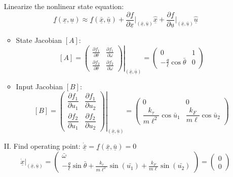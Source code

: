 \documentclass[10pt, fleqn]{article}
\begin{document}
\begin{multicols*}{2}
\begin{itemize}
    Linearize the nonlinear state equation:
    \[\underline{f}(\underline{x},\underline{u}) \approx \underline{f}(\underline{\bar{x}}, \underline{\bar{u}}) + \frac{\partial \underline{f}}{\partial \underline{x}}\bigg|_{(\underline{\bar{x}}, \underline{\bar{u}})} \underline{\hat{x}} + \frac{\partial \underline{f}}{\partial \underline{u}}\bigg|_{(\underline{\bar{x}}, \underline{\bar{u}})} \underline{\hat{u}}\]
    \begin{itemize}
        \item State Jacobian $[A]$:
        \[\renewcommand{\arraystretch}{1.8}
        [A] = \left.\begin{pmatrix}
\frac{\partial f_1}{\partial \theta} & \frac{\partial f_1}{\partial \omega} \\
\frac{\partial f_2}{\partial \theta} & \frac{\partial f_2}{\partial \omega}
\end{pmatrix}\right|_{(\underline{\bar{x}}, \underline{\bar{u}})}=
\begin{pmatrix}
0 & 1 \\
-\frac{g}{\ell}\cos\bar{\theta} & 0
\end{pmatrix}\]
        \item Input Jacobian $[B]$:
\[
\renewcommand{\arraystretch}{1.8}
[B] =
\left.
\begin{pmatrix}
\dfrac{\partial f_1}{\partial u_1} & \dfrac{\partial f_1}{\partial u_2} \\
\dfrac{\partial f_2}{\partial u_1} & \dfrac{\partial f_2}{\partial u_2}
\end{pmatrix}
\right|_{(\underline{\bar{x}}, \underline{\bar{u}})} =
\begin{pmatrix}
0 & 0 \\
\dfrac{k_{\tau}}{m\ell^2}\cos\bar{u}_1 &
\dfrac{k_F}{m\ell}\cos\bar{u}_2
\end{pmatrix}\]
    \end{itemize}
    \item [II.] Find operating point: $\dot{\underline{\bar{x}}} = \underline{f}(\underline{{\bar{x}}},\underline{\bar{u}}) = 0$
    \[\dot{\underline{x}}\big|_{(\underline{\bar{x}}, \underline{\bar{u}})} = \begin{pmatrix} \bar{\omega} \\ -\frac{g}{\ell}\sin\bar{\theta} + \frac{k_\tau}{m\ell^2}\sin(\bar{u_1}) + \frac{k_F}{m\ell}\sin(\bar{u_2}) \end{pmatrix} = \begin{pmatrix} 0 \\ 0 \end{pmatrix}\]

\end{itemize}
\end{multicols*}
\end{document}
